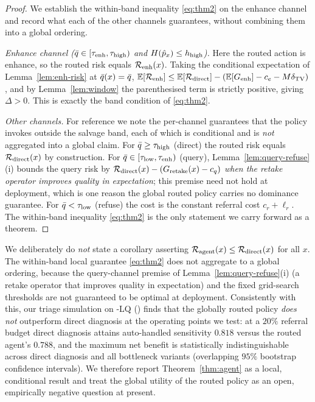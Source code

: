 \begin{proof}
We establish the within-band inequality \eqref{eq:thm2} on the enhance channel and record what
each of the other channels guarantees, without combining them into a global ordering.

\emph{Enhance channel ($\bar{q}\in[\tau_{\mathrm{enh}},\tau_{\mathrm{high}})$ and $H(\hat{p}_x)\leq h_{\mathrm{high}}$).} Here the
routed action is enhance, so the routed risk equals $\mathcal{R}_{\mathrm{enh}}(x)$. Taking the conditional
expectation of Lemma~\ref{lem:enh-risk} at $\bar{q}(x)=\bar{q}$,
$\operatorname*{\mathbb{E}}[\mathcal{R}_{\mathrm{enh}}]\leq\operatorname*{\mathbb{E}}[\mathcal{R}_{\mathrm{direct}}]-(\operatorname*{\mathbb{E}}[G_{\mathrm{enh}}]-c_e-M\delta_{\mathrm{TV}})$, and by Lemma~\ref{lem:window} the
parenthesised term is strictly positive, giving $\Delta>0$. This is exactly the band condition
of \eqref{eq:thm2}.

\emph{Other channels.} For reference we note the per-channel guarantees that the policy invokes
outside the salvage band, each of which is conditional and is \emph{not} aggregated into a
global claim. For $\bar{q}\geq\tau_{\mathrm{high}}$ (direct) the routed risk equals $\mathcal{R}_{\mathrm{direct}}(x)$ by
construction. For $\bar{q}\in[\tau_{\mathrm{low}},\tau_{\mathrm{enh}})$ (query), Lemma~\ref{lem:query-refuse}(i) bounds the
query risk by $\mathcal{R}_{\mathrm{direct}}(x)-(G_{\mathrm{retake}}(x)-c_q)$ \emph{when the retake operator improves quality in
expectation}; this premise need not hold at deployment, which is one reason the global routed
policy carries no dominance guarantee. For $\bar{q}<\tau_{\mathrm{low}}$ (refuse) the cost is the constant
referral cost $c_r+\ell_r$. The within-band inequality \eqref{eq:thm2} is the only statement we
carry forward as a theorem.
\end{proof}

\begin{remark}\label{rem:no-global}
We deliberately do \emph{not} state a corollary asserting $\mathcal{R}_{\mathrm{agent}}(x)\leq\mathcal{R}_{\mathrm{direct}}(x)$ for all
$x$. The within-band local guarantee \eqref{eq:thm2} does not aggregate to a global ordering,
because the query-channel premise of Lemma~\ref{lem:query-refuse}(i) (a retake operator that
improves quality in expectation) and the fixed grid-search thresholds are not guaranteed to be
optimal at deployment. Consistently with this, our triage simulation on \itb{}-LQ
() finds that the globally routed policy \emph{does not} outperform direct
diagnosis at the operating points we test: at a $20\%$ referral budget direct diagnosis attains
auto-handled sensitivity $0.818$ versus the routed agent's $0.788$, and the maximum net benefit
is statistically indistinguishable across direct diagnosis and all bottleneck variants
(overlapping $95\%$ bootstrap confidence intervals). We therefore report Theorem~\ref{thm:agent}
as a local, conditional result and treat the global utility of the routed policy as an open,
empirically negative question at present.
\end{remark}

